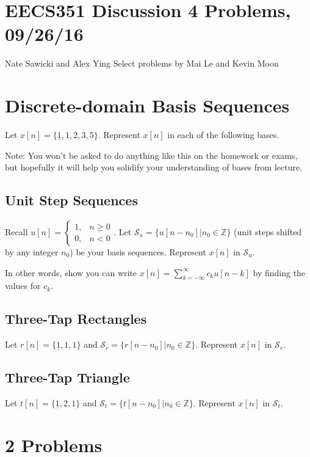 \documentclass[11pt]{article}
\begin{document}
\section*{EECS351 Discussion 4 Problems, 09/26/16}
Nate Sawicki and Alex Ying \newline
Select problems by Mai Le and Kevin Moon


\section{Discrete-domain Basis Sequences}
Let $x[n] = \{\underline{1},1,2,3,5\}$. Represent $x[n]$ in each of the following bases. 

Note: You won't be asked to do anything like this on the homework or exams, but hopefully it will help you solidify your understanding of bases from lecture.

\subsection*{Unit Step Sequences}
Recall $u[n] = \begin{cases}1, & n \geq 0\\ 0, & n < 0 \end{cases}$. Let $\mathcal{S}_u = \{u[n-n_0]|n_0 \in \mathbb{Z}\}$ (unit steps shifted by any integer $n_0$) be your basis sequences. Represent $x[n]$ in $\mathcal{S}_u$.

In other words, show you can write $x[n]=\sum\limits_{k=-\infty}^\infty c_k u[n-k]$ by finding the values for $c_k$.

\subsection*{Three-Tap Rectangles}
Let $r[n] = \{\underline{1},1,1\}$ and $\mathcal{S}_r = \{r[n-n_0]|n_0 \in \mathbb{Z}\}$. Represent $x[n]$ in $\mathcal{S}_r$.

\subsection*{Three-Tap Triangle}
Let $t[n] = \{\underline{1},2,1\}$ and $\mathcal{S}_t = \{t[n-n_0]|n_0 \in \mathbb{Z}\}$. Represent $x[n]$ in $\mathcal{S}_t$.








\section*{2 Problems}
\end{document}
